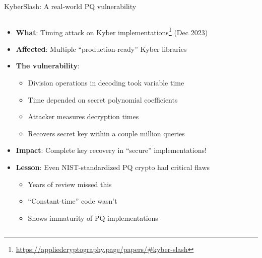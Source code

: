 \documentclass[aspectratio=169, lualatex, handout]{beamer}
\begin{document}
\begin{frame}{KyberSlash: A real-world PQ vulnerability}
	\begin{columns}[c]
		\begin{column}{1\textwidth}
			\begin{itemize}
				\item \textbf{What}: Timing attack on Kyber implementations\footnote{\url{https://appliedcryptography.page/papers/\#kyber-slash}} (Dec 2023)
				\item \textbf{Affected}: Multiple ``production-ready'' Kyber libraries
				\item \textbf{The vulnerability}:
				      \begin{itemize}
					      \item Division operations in decoding took variable time
					      \item Time depended on secret polynomial coefficients
					      \item Attacker measures decryption times
					      \item Recovers secret key within a couple million queries
				      \end{itemize}
				\item \textbf{Impact}: Complete key recovery in ``secure'' implementations!
				\item \textbf{Lesson}: Even NIST-standardized PQ crypto had critical flaws
				      \begin{itemize}
					      \item Years of review missed this
					      \item ``Constant-time'' code wasn't
					      \item Shows immaturity of PQ implementations
				      \end{itemize}
			\end{itemize}
		\end{column}
	\end{columns}
\end{frame}
\end{document}
